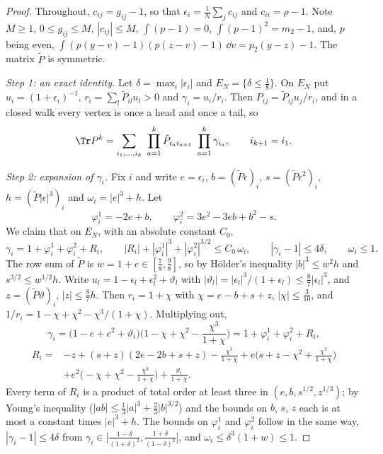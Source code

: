 \begin{proof}
Throughout, $c_{ij}=g_{ij}-1$, so that $\epsilon_i=\frac1N\sum_jc_{ij}$ and $c_{ii}=\rho-1$. Note $M\ge1$, $0\le g_{ij}\le M$, $|c_{ij}|\le M$, $\int(p-1)=0$, $\int(p-1)^2=m_2-1$, and, $p$ being even, $\int(p(y-v)-1)(p(z-v)-1)\,\dd v=p_2(y-z)-1$. The matrix $\tilde P$ is symmetric.

\emph{Step 1: an exact identity.} Let $\delta=\max_i|\epsilon_i|$ and $E_N=\{\delta\le\frac18\}$. On $E_N$ put $u_i=(1+\epsilon_i)^{-1}$, $r_i=\sum_l\tilde P_{il}u_l>0$ and $\gamma_i=u_i/r_i$. Then $P_{ij}=\tilde P_{ij}u_j/r_i$, and in a closed walk every vertex is once a head and once a tail, so
\begin{equation}\label{eq:bias-identity}
\Tr P^k=\sum_{i_1,\dots,i_k}\ \prod_{a=1}^k\tilde P_{i_ai_{a+1}}\ \prod_{a=1}^k\gamma_{i_a},\qquad i_{k+1}=i_1 .
\end{equation}

\emph{Step 2: expansion of $\gamma_i$.} Fix $i$ and write $e=\epsilon_i$, $b=(\tilde P\epsilon)_i$, $s=(\tilde P\epsilon^2)_i$, $h=(\tilde P|\epsilon|^3)_i$ and $\omega_i=|e|^3+h$. Let
\[
\varphi^1_i=-2e+b,\qquad\varphi^2_i=3e^2-3eb+b^2-s .
\]
We claim that on $E_N$, with an absolute constant $C_0$,
\begin{equation}\label{eq:bias-gamma}
\gamma_i=1+\varphi^1_i+\varphi^2_i+R_i,\qquad|R_i|+|\varphi^1_i|^3+|\varphi^2_i|^{3/2}\le C_0\,\omega_i,\qquad|\gamma_i-1|\le4\delta,\qquad\omega_i\le1 .
\end{equation}
The row sum of $\tilde P$ is $w=1+e\in[\frac78,\frac98]$, so by H\"older's inequality $|b|^3\le w^2h$ and $s^{3/2}\le w^{1/2}h$. Write $u_l=1-\epsilon_l+\epsilon_l^2+\vartheta_l$ with $|\vartheta_l|=|\epsilon_l|^3/(1+\epsilon_l)\le\frac87|\epsilon_l|^3$, and $z=(\tilde P\vartheta)_i$, $|z|\le\frac87h$. Then $r_i=1+\chi$ with $\chi=e-b+s+z$, $|\chi|\le\frac{3}{10}$, and $1/r_i=1-\chi+\chi^2-\chi^3/(1+\chi)$. Multiplying out,
\[
\gamma_i=\big(1-e+e^2+\vartheta_i\big)\Big(1-\chi+\chi^2-\frac{\chi^3}{1+\chi}\Big)=1+\varphi^1_i+\varphi^2_i+R_i,
\]
\[
\begin{aligned}
R_i={}&-z+(s+z)(2e-2b+s+z)-\frac{\chi^3}{1+\chi}+e\Big(s+z-\chi^2+\frac{\chi^3}{1+\chi}\Big)\\
&+e^2\Big(-\chi+\chi^2-\frac{\chi^3}{1+\chi}\Big)+\frac{\vartheta_i}{1+\chi}.
\end{aligned}
\]
Every term of $R_i$ is a product of total order at least three in $(e,b,s^{1/2},z^{1/3})$; by Young's inequality ($|ab|\le\frac13|a|^3+\frac23|b|^{3/2}$) and the bounds on $b$, $s$, $z$ each is at most a constant times $|e|^3+h$. The bounds on $\varphi^1_i$ and $\varphi^2_i$ follow in the same way, $|\gamma_i-1|\le4\delta$ from $\gamma_i\in\big[\frac{1-\delta}{(1+\delta)^2},\frac{1+\delta}{(1-\delta)^2}\big]$, and $\omega_i\le\delta^3(1+w)\le1$.


\end{proof}
